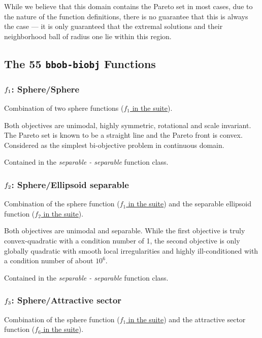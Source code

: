\documentclass[letterpaper,12pt,english]{article}
\begin{document}
While we believe that this domain contains the Pareto set in most cases, due to the nature
of the  function definitions, there is no guarantee that this
is always the case --- it is only guaranteed that the extremal solutions and their
neighborhood ball of radius one lie within this region.


\subsection{The 55 \texttt{bbob-biobj} Functions}
\label{index:the-55-bbob-biobj-functions}\label{index:coco-problem-get-smallest-value-of-interest}

\subsubsection{\protect\(f_1\protect\): Sphere/Sphere}
\label{index:f1}\label{index:sphere-sphere}
Combination of two sphere functions (\href{http://coco.lri.fr/downloads/download15.03/bbobdocfunctions.pdf\#page=5}{\(f_1\) in the  suite}).

Both objectives are unimodal, highly symmetric, rotational and scale
invariant. The Pareto set is known to be a straight line and the Pareto
front is convex. Considered as the simplest bi-objective problem in
continuous domain.

Contained in the \emph{separable - separable} function class.


\subsubsection{\protect\(f_2\protect\): Sphere/Ellipsoid separable}
\label{index:f2}\label{index:sphere-ellipsoid-separable}
Combination of the sphere function (\href{http://coco.lri.fr/downloads/download15.03/bbobdocfunctions.pdf\#page=5}{\(f_1\) in the  suite})
and the separable ellipsoid function (\href{http://coco.lri.fr/downloads/download15.03/bbobdocfunctions.pdf\#page=10}{\(f_2\) in the  suite}).

Both objectives are unimodal and separable. While the first objective is
truly convex-quadratic with a condition number of 1, the second
objective is only globally quadratic with smooth local
irregularities and highly ill-conditioned with a condition number of
about \(10^6\).

Contained in the \emph{separable - separable} function class.


\subsubsection{\protect\(f_3\protect\): Sphere/Attractive sector}
\label{index:f3}\label{index:sphere-attractive-sector}
Combination of the sphere function (\href{http://coco.lri.fr/downloads/download15.03/bbobdocfunctions.pdf\#page=5}{\(f_1\) in the  suite})
and the attractive sector function (\href{http://coco.lri.fr/downloads/download15.03/bbobdocfunctions.pdf\#page=30}{\(f_6\) in the  suite}).
\end{document}
